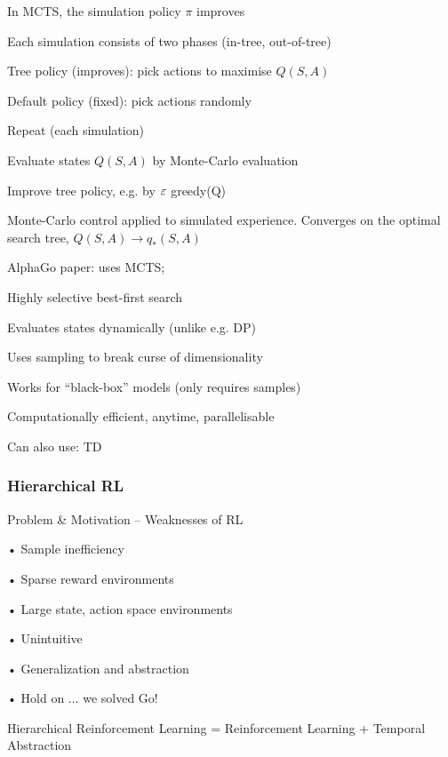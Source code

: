 \documentclass[english]{article}
\begin{document}
In MCTS, the simulation policy $\pi$ improves

Each simulation consists of two phases (in-tree, out-of-tree)
\benum 
\item 
Tree policy (improves): pick actions to maximise $Q(S,A)$
\item 
Default policy (fixed): pick actions randomly
\eenum 
\item 
Repeat (each simulation)
\benum 
\item 
Evaluate states $Q(S,A)$ by Monte-Carlo evaluation
\item 
Improve tree policy, e.g. by $\varepsilon$ greedy(Q)
\eenum 
\item 

Monte-Carlo control applied to simulated experience. Converges on the optimal search tree, $Q(S,A) \to q_*(S,A)$




\item AlphaGo paper: uses MCTS; 

\benum 
\item 
Highly selective best-first search
\item 
Evaluates states dynamically (unlike e.g. DP)
\item 
Uses sampling to break curse of dimensionality
\item 
Works for “black-box” models (only requires samples)
\item 
Computationally efficient, anytime, parallelisable
\eenum 

Can also use: TD

\eenum




\subsubsection{Hierarchical RL}
\benum

\item Problem \& Motivation – Weaknesses of RL

•  Sample inefficiency

• Sparse reward
environments

• Large state, action space
environments

• Unintuitive

• Generalization and
abstraction

• Hold on ... we solved Go!

\item Hierarchical
Reinforcement Learning = 
Reinforcement Learning
+
Temporal
Abstraction
\end{document}
